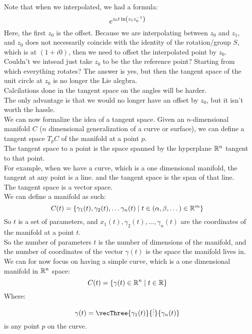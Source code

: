 \documentclass[12pt]{article}
\begin{document}
Note that when we interpolated,
we had a formula:
\[ e^{{z_0t\ln\left( z_1z_0^{-1} \right)}} \]
Here, the first $z_0$ is the offset.
Because we are interpolating between $z_0$
and $z_1$, and $z_0$
does not necessarily coincide with the
identity of the rotation/group $S$,
which is at $(1 + i0)$,
then we need to offset the interpolated point
by $z_0$. \\
Couldn't we intsead just take $z_0$ to
be the the reference point?
Starting from which everything rotates?
The answer is yes, but then the tangent
space of the unit circle at $z_0$
is no longer the Lie alegbra. \\
Calcilations done in the tangent space 
on the angles will be harder. \\
The only advantage is that we would no longer
have an offset by $z_0$,
but it isn't worth the hassle. \\

We can now formalize the idea of a tangent space.
Given an $n$-dimensional manifold $C$
($n$ dimensional
generalization of a curve or surface),
we can define a tangent space
$T_pC$ of the manifold at a point $p$. \\
The tangent space to a point is the space spanned
by the hyperplane $\mathbb{R}^{n}$
tangent to that point. \\
For example, when we have a curve,
which is a one dimensional manifold,
the tangent at any point is a line.
and the tangent space is the span
of that line. \\

The tangent space is a vector space. \\

We can define a manifold as such:
\[ C(t) = \{\gamma_1(t),\gamma_2(t), 
\dots\gamma_n(t) \mid
t \in (\alpha, \beta, \dots) \in \mathbb{R}^m \} \]
So $t$ is a set of parameters,
and $x_1(t),\gamma_2(t), \dots,\gamma_n(t)$
are the coordinates of the manifold at
a point $t$. \\

So the number of parameters $t$ is the number
of dimensions of the manifold,
and the number of coordinates of the
vector $\gamma(t)$ is the space
the manifold lives in. \\

We can for now focus on having a simple
curve, which is a one dimensional manifold
in $\mathbb{R}^n$ space:
\[ C(t) = \{\gamma(t) \in \mathbb{R}^n \mid t \in \mathbb{R} \} \]
Where:
\[ \gamma(t) = \vecThree{\gamma_1(t)}
{\vdots}{\gamma_n(t)} \]
is any point $p$ on the curve. \\
\end{document}
